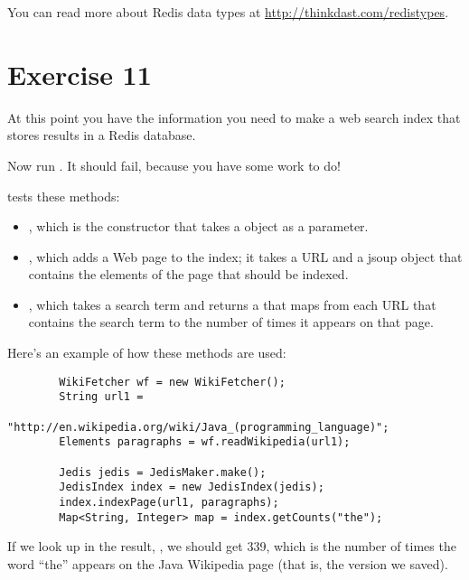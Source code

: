 \documentclass[12pt]{book}
\theoremstyle{exercise}
\begin{document}
You can read more about Redis data types at
\url{http://thinkdast.com/redistypes}.


\section{Exercise 11}
\label{exercise11}

At this point you have the information you need to make a web search
index that stores results in a Redis database.


Now run . It should
fail, because you have some work to do!

 tests these methods:

\begin{itemize}

\item
  , which is the constructor that takes a
   object as a parameter.

\item
  , which adds a Web page to the index; it takes a
   URL and a jsoup  object that contains the
  elements of the page that should be indexed.

\item
  , which takes a search term and returns a
   that maps from
  each URL that contains the search term to the number of times it
  appears on that page.

\end{itemize}

Here's an example of how these methods are used:

\begin{verbatim}
        WikiFetcher wf = new WikiFetcher();
        String url1 = 
            "http://en.wikipedia.org/wiki/Java_(programming_language)";
        Elements paragraphs = wf.readWikipedia(url1);

        Jedis jedis = JedisMaker.make();
        JedisIndex index = new JedisIndex(jedis);
        index.indexPage(url1, paragraphs);
        Map<String, Integer> map = index.getCounts("the");
\end{verbatim}

If we look up  in the result, , we should get
339, which is the number of times the word ``the'' appears
on the Java Wikipedia page (that is, the version we saved).
\end{document}
